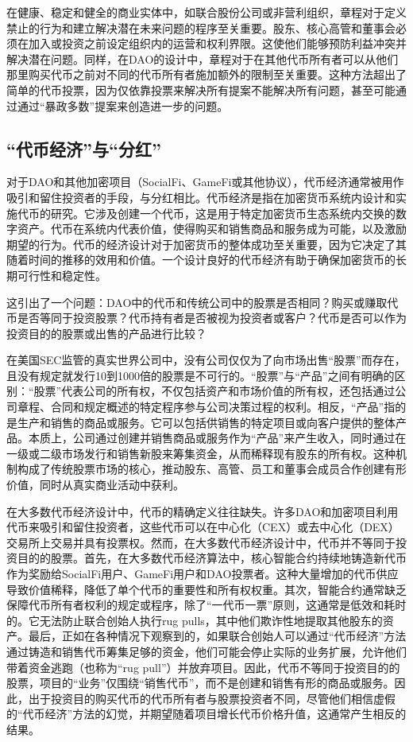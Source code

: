 \documentclass[main.tex]{subfiles}
\begin{document}
在健康、稳定和健全的商业实体中，如联合股份公司或非营利组织，章程对于定义禁止的行为和建立解决潜在未来问题的程序至关重要。股东、核心高管和董事会必须在加入或投资之前设定组织内的运营和权利界限。这使他们能够预防利益冲突并解决潜在问题。同样，在DAO的设计中，章程对于在其他代币所有者可以从他们那里购买代币之前对不同的代币所有者施加额外的限制至关重要。这种方法超出了简单的代币投票，因为仅依靠投票来解决所有提案不能解决所有问题，甚至可能通过通过“暴政多数”提案来创造进一步的问题。

\subsection{``代币经济''与``分红''}

对于DAO和其他加密项目（SocialFi、GameFi或其他协议），代币经济通常被用作吸引和留住投资者的手段，与分红相比。代币经济是指在加密货币系统内设计和实施代币的研究。它涉及创建一个代币，这是用于特定加密货币生态系统内交换的数字资产。代币在系统内代表价值，使得购买和销售商品和服务成为可能，以及激励期望的行为。代币的经济设计对于加密货币的整体成功至关重要，因为它决定了其随着时间的推移的效用和价值。一个设计良好的代币经济有助于确保加密货币的长期可行性和稳定性。

这引出了一个问题：DAO中的代币和传统公司中的股票是否相同？购买或赚取代币是否等同于投资股票？代币持有者是否被视为投资者或客户？代币是否可以作为投资目的的股票或出售的产品进行比较？

在美国SEC监管的真实世界公司中，没有公司仅仅为了向市场出售``股票''而存在，且没有规定就发行10到1000倍的股票是不可行的。``股票''与``产品''之间有明确的区别：``股票''代表公司的所有权，不仅包括资产和市场价值的所有权，还包括通过公司章程、合同和规定概述的特定程序参与公司决策过程的权利。相反，``产品''指的是生产和销售的商品或服务。它可以包括供销售的特定项目或向客户提供的整体产品。本质上，公司通过创建并销售商品或服务作为``产品''来产生收入，同时通过在一级或二级市场发行和销售新股来筹集资金，从而稀释现有股东的所有权。这种机制构成了传统股票市场的核心，推动股东、高管、员工和董事会成员合作创建有形价值，同时从真实商业活动中获利。

在大多数代币经济设计中，代币的精确定义往往缺失。许多DAO和加密项目利用代币来吸引和留住投资者，这些代币可以在中心化（CEX）或去中心化（DEX）交易所上交易并具有投票权。然而，在大多数代币经济设计中，代币并不等同于投资目的的股票。首先，在大多数代币经济算法中，核心智能合约持续地铸造新代币作为奖励给SocialFi用户、GameFi用户和DAO投票者。这种大量增加的代币供应导致价值稀释，降低了单个代币的重要性和所有权权重。其次，智能合约通常缺乏保障代币所有者权利的规定或程序，除了“一代币一票”原则，这通常是低效和耗时的。它无法防止联合创始人执行rug pulls，其中他们欺诈性地提取其他股东的资产。最后，正如在各种情况下观察到的，如果联合创始人可以通过“代币经济”方法通过铸造和销售代币筹集足够的资金，他们可能会停止实际的业务扩展，允许他们带着资金逃跑（也称为“rug pull”）并放弃项目。因此，代币不等同于投资目的的股票，项目的“业务”仅围绕“销售代币”，而不是创建和销售有形的商品或服务。因此，出于投资目的购买代币的代币所有者与股票投资者不同，尽管他们相信虚假的``代币经济''方法的幻觉，并期望随着项目增长代币价格升值，这通常产生相反的结果。
\end{document}
